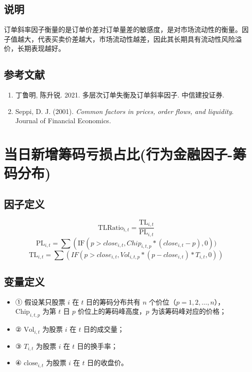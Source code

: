 \documentclass{article}
\begin{document}
\subsection{说明}
订单斜率因子衡量的是订单价差对订单量差的敏感度，是对市场流动性的衡量。因子值越大，代表买卖价差越大，市场流动性越差，因此其长期具有流动性风险溢价，长期表现越好。

\subsection{参考文献}
\begin{enumerate}
    \item 丁鲁明, 陈升锐. 2021. 多层次订单失衡及订单斜率因子. 中信建投证券.
    \item Seppi, D. J. (2001). \textit{Common factors in prices, order flows, and liquidity}. Journal of Financial Economics.
\end{enumerate}

\section{当日新增筹码亏损占比(行为金融因子-筹码分布)}

\subsection{因子定义}

\begin{equation}
    \mathrm{TLRatio}_{i,t} = \frac{\mathrm{TL}_{i,t}}{\mathrm{PL}_{i,t}}
\end{equation}
\begin{equation}
    \mathrm{PL}_{i,t} = \sum \left( \mathrm{IF}(p> close_{i,t},Chip_{i,t,p}* (close_{i,t}-p),0))
\end{equation}
\begin{equation}
    \mathrm{TL}_{i,t} = \sum (IF(p > close_{i,t},Vol_{i,t,p}*(p-close_{i,t})*T_{i,t},0))
\end{equation}

\subsection{变量定义}
\begin{itemize}
    \item ① 假设某只股票 \( i \) 在 \( t \) 日的筹码分布共有 \( n \) 个价位（\( p = 1, 2, \ldots, n \)），\( \mathrm{Chip}_{i,t,p} \) 为第 \( t \) 日 \( p \) 价位上的筹码峰高度，\( p \) 为该筹码峰对应的价格；
    \item ② \( \mathrm{Vol}_{i,t} \) 为股票 \( i \) 在 \( t \) 日的成交量；
    \item ③ \( T_{i,t} \) 为股票 \( i \) 在 \( t \) 日的换手率；
    \item ④ \( \mathrm{close}_{i,t} \) 为股票 \( i \) 在 \( t \) 日的收盘价。
\end{itemize}
\end{document}
